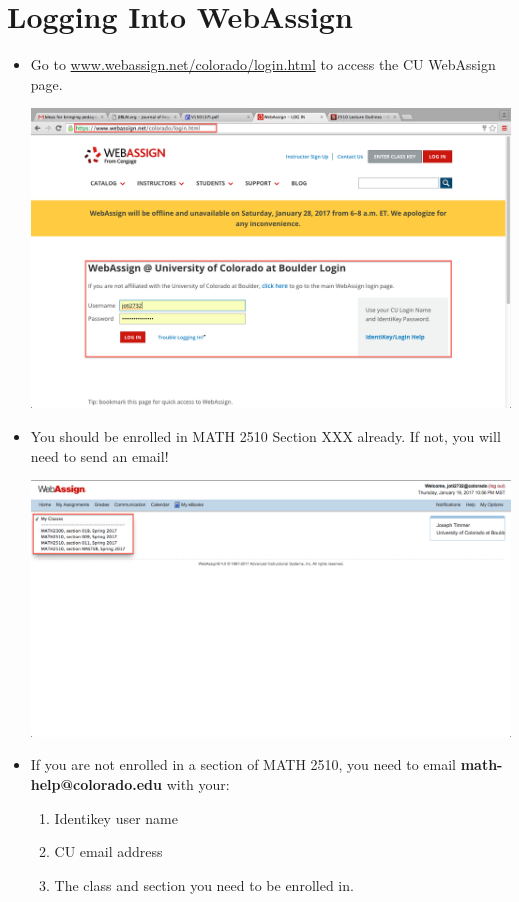 \documentclass{article}
\begin{document}
\section*{Logging Into WebAssign}

\begin{itemize} 

\item Go to \url{www.webassign.net/colorado/login.html} to access the CU WebAssign page.

\begin{center}
\includegraphics[scale=0.25]{login.png}
\end{center}

\item You should be enrolled in MATH 2510 Section XXX already. If not, you will need to send an email!

\begin{center}
\includegraphics[scale=0.25]{classes.png}
\end{center}

\item If you are not enrolled in a section of MATH 2510, you need to email {\bf math-help@colorado.edu} with your: \begin{enumerate} \item Identikey user name \item CU email address \item The class and section you need to be enrolled in. \end{enumerate}


\end{itemize}
\end{document}
